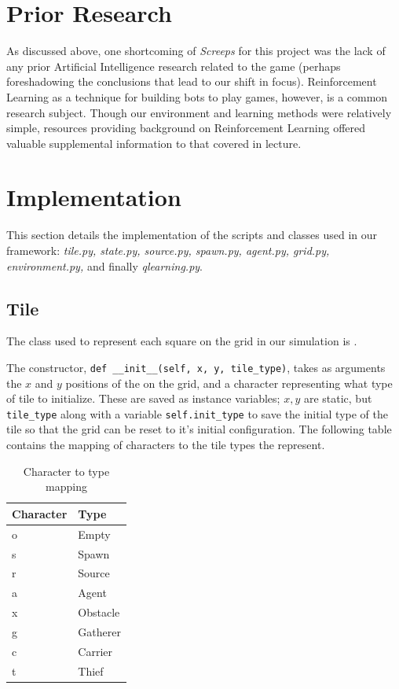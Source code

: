 \documentclass[11pt]{article}
\begin{document}
\section{Prior Research}

As discussed above, one shortcoming of \textit{Screeps} for this project was the lack of any prior Artificial Intelligence research related to the game (perhaps foreshadowing the conclusions that lead to our shift in focus). Reinforcement Learning as a technique for building bots to play games, however, is a common research subject. Though our environment and learning methods were relatively simple, resources providing background on Reinforcement Learning offered valuable supplemental information to that covered in lecture.

\section{Implementation}

This section details the implementation of the scripts and classes used in our framework: \textit{tile.py, state.py, source.py, spawn.py, agent.py, grid.py, environment.py,} and finally \textit{qlearning.py}.

\subsection{Tile}

The class used to represent each square on the grid in our simulation is .

The constructor, \texttt{def __init__(self, x, y, tile_type)}, takes as arguments the $x$ and $y$ positions of the  on the grid, and a character representing what type of tile to initialize. These are saved as instance variables; $x, y$ are static, but \texttt{tile_type} along with a variable \texttt{self.init_type} to save the initial type of the tile so that the grid can be reset to it's initial configuration. The following table contains the mapping of characters to the tile types the represent.

\begin{table}[h]
\centering
\caption{Character to type mapping}
\begin{tabular}{|l|l|}
\hline
Character & Type \\ \hline
o & Empty \\ \hline
s & Spawn \\ \hline
r & Source \\ \hline
a & Agent \\ \hline
x & Obstacle \\ \hline
g & Gatherer \\ \hline
c & Carrier \\ \hline
t & Thief \\ \hline
\end{tabular}
\end{table}
\end{document}
